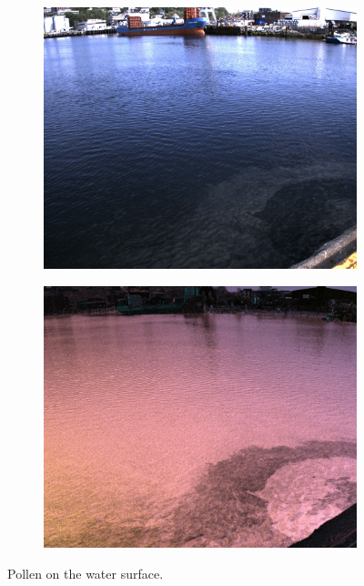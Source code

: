 \begin{figure}[H]
    \begin{subfigure}[T]{.49\textwidth}
        \includegraphics[width=\textwidth]{figures/pictures/img_3726_s0.jpg}
    \end{subfigure} \hfill
    \begin{subfigure}[T]{.49\textwidth}
        \includegraphics[width=\textwidth]{figures/pictures/img_3726_pol.jpg}
    \end{subfigure}
    \caption{Pollen on the water surface.}
\end{figure}
\vspace{-.5cm}

